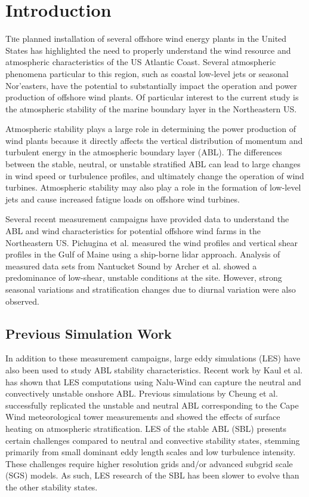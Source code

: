 \documentclass[conf]{new-aiaa}
\begin{document}
\section{Introduction}

\lettrine{T}he planned installation of several offshore wind energy
plants in the United States has highlighted the need to properly
understand the wind resource and atmospheric characteristics of the US
Atlantic Coast.  Several atmospheric phenomena particular to this
region, such as coastal low-level jets or seasonal Nor’easters, have
the potential to substantially impact the operation and power
production of offshore wind plants.  Of particular interest to the
current study is the atmospheric stability of the marine boundary
layer in the Northeastern US.

Atmospheric stability plays a large role in determining the power
production of wind plants because it directly affects the vertical
distribution of momentum and turbulent energy in the atmospheric
boundary layer (ABL).  The differences between the stable, neutral, or
unstable stratified ABL can lead to large changes in wind speed or
turbulence profiles, and ultimately change the operation of wind
turbines.  Atmospheric stability may also play a role in the formation
of low-level jets \cite{nunalee2014mesoscale} and cause increased
fatigue loads on offshore wind turbines.

Several recent measurement campaigns have provided data to understand
the ABL and wind characteristics for potential offshore wind farms in
the Northeastern US.  Pichugina et al. \cite{pichugina2017properties}
measured the wind profiles and vertical shear profiles in the Gulf of
Maine using a ship-borne lidar approach.  Analysis of measured data
sets from Nantucket Sound by Archer et
al. \cite{archer2016predominance} showed a predominance of low-shear,
unstable conditions at the site.  However, strong seasonal variations
and stratification changes due to diurnal variation were also
observed.

\subsection{Previous Simulation Work}

In addition to these measurement campaigns, large eddy simulations (LES) have
also been used to study ABL stability characteristics.  Recent work by
Kaul et al. \cite{kaul2020large} has shown that LES computations using
Nalu-Wind can capture the neutral and convectively unstable onshore
ABL.  Previous simulations by Cheung et al. \cite{cheung2020large}
successfully replicated the unstable and neutral ABL corresponding to
the Cape Wind meteorological tower measurements
\cite{archer2016predominance} and showed the effects of surface
heating on atmospheric stratification. LES of the stable ABL (SBL) presents
certain challenges compared to neutral and convective stability states, stemming
primarily from small dominant eddy length scales and low turbulence intensity.
These challenges require higher resolution grids and/or advanced subgrid
scale (SGS) models. As such, LES research of the SBL has been slower
to evolve than the other stability states.
\end{document}

